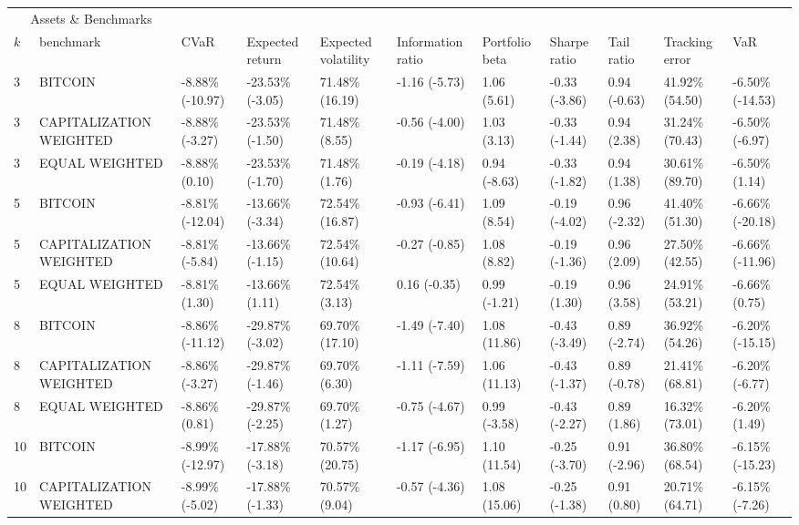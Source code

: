 \documentclass{article}
\begin{document}
\begin{landscape}
\begin{table}[H]
  \centering
  \begin{tabular}{p{0.4cm}|p{3cm}|p{1.65cm}|p{1.65cm}|p{1.65cm}|p{1.65cm}|p{1.65cm}|p{1.65cm}|p{1.65cm}|p{1.65cm}|p{1.65cm}}%
    \toprule
    \multicolumn{2}{c}{Assets \& Benchmarks}                   \\
    \cmidrule(r){1-2}
    $k$ & benchmark & CVaR & Expected return & Expected volatility&Information ratio&Portfolio beta&Sharpe ratio&Tail ratio&Tracking error&VaR\\
    \midrule
    3&BITCOIN&-8.88\% (-10.97)&-23.53\% (-3.05)&71.48\% (16.19)&-1.16 (-5.73)&1.06 (5.61)&-0.33 (-3.86)&0.94 (-0.63)&41.92\% (54.50)&-6.50\% (-14.53)
\\ 
3&CAPITALIZATION WEIGHTED&-8.88\% (-3.27)&-23.53\% (-1.50)&71.48\% (8.55)&-0.56 (-4.00)&1.03 (3.13)&-0.33 (-1.44)&0.94 (2.38)&31.24\% (70.43)&-6.50\% (-6.97)
\\ 
3&EQUAL WEIGHTED&-8.88\% (0.10)&-23.53\% (-1.70)&71.48\% (1.76)&-0.19 (-4.18)&0.94 (-8.63)&-0.33 (-1.82)&0.94 (1.38)&30.61\% (89.70)&-6.50\% (1.14)
\\ 
5&BITCOIN&-8.81\% (-12.04)&-13.66\% (-3.34)&72.54\% (16.87)&-0.93 (-6.41)&1.09 (8.54)&-0.19 (-4.02)&0.96 (-2.32)&41.40\% (51.30)&-6.66\% (-20.18)
\\ 
5&CAPITALIZATION WEIGHTED&-8.81\% (-5.84)&-13.66\% (-1.15)&72.54\% (10.64)&-0.27 (-0.85)&1.08 (8.82)&-0.19 (-1.36)&0.96 (2.09)&27.50\% (42.55)&-6.66\% (-11.96)
\\ 
5&EQUAL WEIGHTED&-8.81\% (1.30)&-13.66\% (1.11)&72.54\% (3.13)&0.16 (-0.35)&0.99 (-1.21)&-0.19 (1.30)&0.96 (3.58)&24.91\% (53.21)&-6.66\% (0.75)
\\ 
8&BITCOIN&-8.86\% (-11.12)&-29.87\% (-3.02)&69.70\% (17.10)&-1.49 (-7.40)&1.08 (11.86)&-0.43 (-3.49)&0.89 (-2.74)&36.92\% (54.26)&-6.20\% (-15.15)
\\ 
8&CAPITALIZATION WEIGHTED&-8.86\% (-3.27)&-29.87\% (-1.46)&69.70\% (6.30)&-1.11 (-7.59)&1.06 (11.13)&-0.43 (-1.37)&0.89 (-0.78)&21.41\% (68.81)&-6.20\% (-6.77)
\\ 
8&EQUAL WEIGHTED&-8.86\% (0.81)&-29.87\% (-2.25)&69.70\% (1.27)&-0.75 (-4.67)&0.99 (-3.58)&-0.43 (-2.27)&0.89 (1.86)&16.32\% (73.01)&-6.20\% (1.49)
\\ 
10&BITCOIN&-8.99\% (-12.97)&-17.88\% (-3.18)&70.57\% (20.75)&-1.17 (-6.95)&1.10 (11.54)&-0.25 (-3.70)&0.91 (-2.96)&36.80\% (68.54)&-6.15\% (-15.23)
\\ 
10&CAPITALIZATION WEIGHTED&-8.99\% (-5.02)&-17.88\% (-1.33)&70.57\% (9.04)&-0.57 (-4.36)&1.08 (15.06)&-0.25 (-1.38)&0.91 (0.80)&20.71\% (64.71)&-6.15\% (-7.26)

\end{tabular}
\end{table}
\end{landscape}
\end{document}
